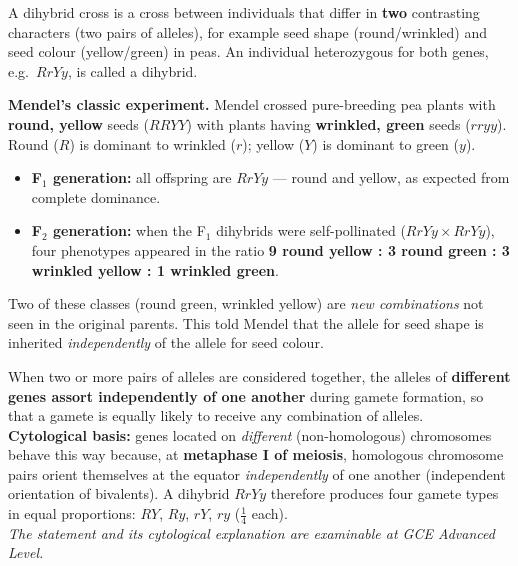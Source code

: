 \documentclass[11pt]{article}
\newcommand{\cle}[1]{{\popxbold\color{popdark}#1}}
\begin{document}
\begin{definition}
A \cle{dihybrid cross} is a cross between individuals that differ in \textbf{two} contrasting characters (two pairs of alleles), for example seed shape (round/wrinkled) and seed colour (yellow/green) in peas. An individual heterozygous for both genes, e.g.\ $RrYy$, is called a \cle{dihybrid}.
\end{definition}

\textbf{Mendel's classic experiment.} Mendel crossed pure-breeding pea plants with \textbf{round, yellow} seeds ($RRYY$) with plants having \textbf{wrinkled, green} seeds ($rryy$). Round ($R$) is dominant to wrinkled ($r$); yellow ($Y$) is dominant to green ($y$).

\begin{itemize}
\item \textbf{F$_1$ generation:} all offspring are $RrYy$ --- round and yellow, as expected from complete dominance.
\item \textbf{F$_2$ generation:} when the F$_1$ dihybrids were self-pollinated ($RrYy \times RrYy$), four phenotypes appeared in the ratio \textbf{9 round yellow : 3 round green : 3 wrinkled yellow : 1 wrinkled green}.
\end{itemize}

Two of these classes (round green, wrinkled yellow) are \emph{new combinations} not seen in the original parents. This told Mendel that the allele for seed shape is inherited \emph{independently} of the allele for seed colour.

\begin{propriete}
When two or more pairs of alleles are considered together, the alleles of \textbf{different genes assort independently of one another} during gamete formation, so that a gamete is equally likely to receive any combination of alleles.\\
\textbf{Cytological basis:} genes located on \emph{different} (non-homologous) chromosomes behave this way because, at \textbf{metaphase I of meiosis}, homologous chromosome pairs orient themselves at the equator \emph{independently} of one another (independent orientation of bivalents). A dihybrid $RrYy$ therefore produces four gamete types in equal proportions: $RY$, $Ry$, $rY$, $ry$ ($\tfrac{1}{4}$ each).\\
\emph{The statement and its cytological explanation are examinable at GCE Advanced Level.}
\end{propriete}
\end{document}
